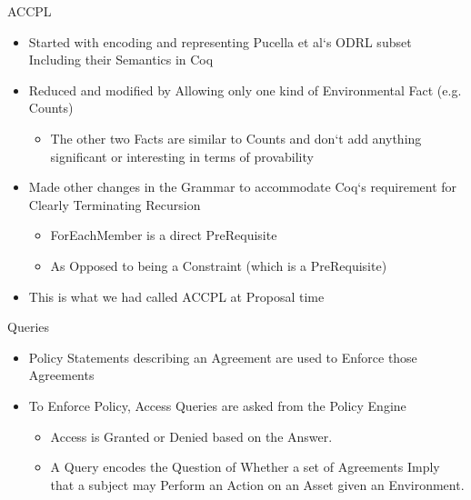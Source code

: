 \documentclass{beamer}
\begin{document}
\begin{frame}[fragile]{ACCPL}
\begin{itemize}
\item Started with encoding and representing Pucella et al`s ODRL subset Including their Semantics in Coq
\item Reduced and modified by Allowing only one kind of Environmental Fact (e.g. Counts)
   \begin{itemize}
      \item The other two Facts are similar to Counts and don`t add anything significant or interesting in terms of provability 
   \end{itemize}
\item Made other changes in the Grammar to accommodate Coq`s requirement for Clearly Terminating Recursion
    \begin{itemize}
        \item ForEachMember is a direct PreRequisite
        \item As Opposed to being a Constraint (which is a PreRequisite)
    \end{itemize}
\item This is what we had called ACCPL at Proposal time
\end{itemize}
\end{frame}
\begin{frame}[fragile]{Queries}
\begin{itemize}
\item Policy Statements describing an Agreement are used to Enforce those Agreements 
\item To Enforce Policy, Access Queries are asked from the Policy Engine
    \begin{itemize}
       \item Access is Granted or Denied based on the Answer.
       \item A Query encodes the Question of Whether a set of Agreements Imply that a subject may Perform an Action on an Asset given an Environment.
     \end{itemize}
\end{itemize}
\end{frame}
\end{document}
